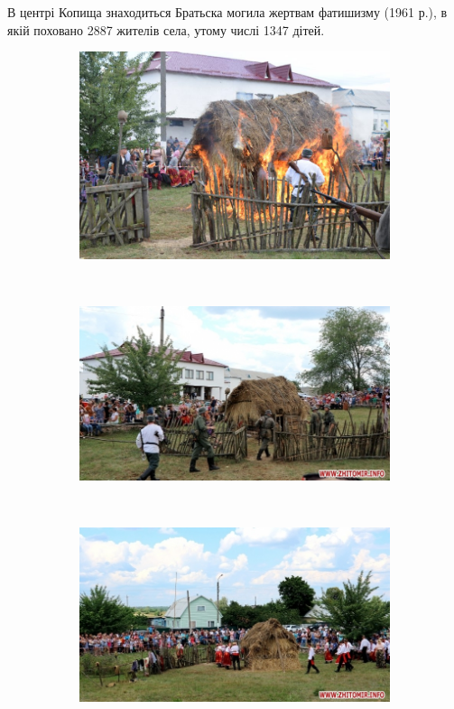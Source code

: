 В центрі Копища знаходиться Братьска могила жертвам фатишизму (1961 р.), в якій поховано 2887 жителів села, утому числі 1347 дітей.
\begin{figure}
	\centering
	\begin{subfigure}[b]{0.3\textwidth}
		\includegraphics[width=\textwidth]{1.jpg}
		\caption{}
		\label{fig:gull}
	\end{subfigure}
	~ %
	\begin{subfigure}[b]{0.3\textwidth}
		\includegraphics[width=\textwidth]{2.jpg}
		\caption{}
		\label{fig:tiger}
	\end{subfigure}
	~ %
	\begin{subfigure}[b]{0.3\textwidth}
		\includegraphics[width=\textwidth]{3.jpg}

\end{subfigure}
\end{figure}
